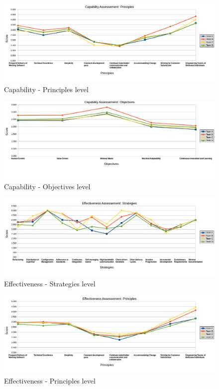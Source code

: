\begin{figure}[H]
\centerline{\includegraphics[scale=0.55]{include/case_study/fig/team_capability_principles.png}}
\caption{Capability - Principles level} 
\label{fig:team_capability_principles}
\end{figure}

\begin{figure}[H]
\centerline{\includegraphics[scale=0.55]{include/case_study/fig/team_capability_objectives.png}}
\caption{Capability - Objectives level} 
\label{fig:team_capability_objectives}
\end{figure}

\begin{figure}[H]
\centerline{\includegraphics[scale=0.55]{include/case_study/fig/team_effectiveness_strategies.png}}
\caption{Effectiveness - Strategies level} 
\label{fig:team_effectiveness_strategies}
\end{figure}

\begin{figure}[H]
\centerline{\includegraphics[scale=0.55]{include/case_study/fig/team_effectiveness_principles.png}}
\caption{Effectiveness - Principles level} 
\label{fig:team_effectiveness_principles}
\end{figure}


